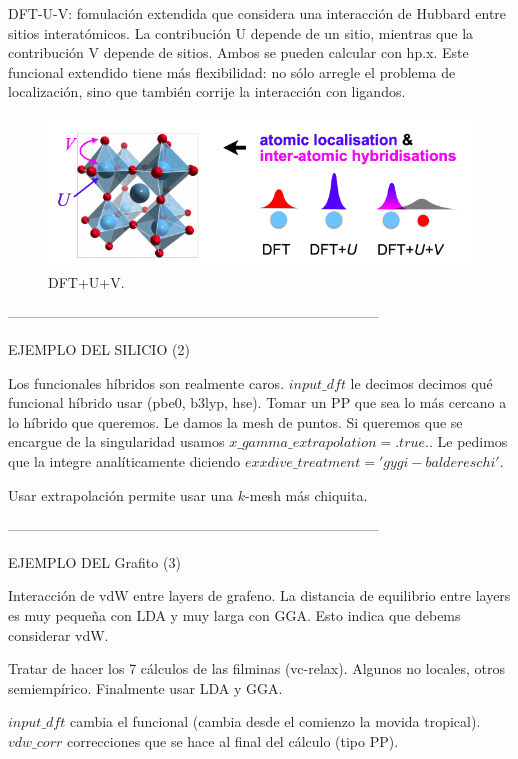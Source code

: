   DFT-U-V: fomulación extendida que considera una interacción de Hubbard entre sitios interatómicos. La contribución U depende de un sitio, mientras que la contribución V depende de sitios. Ambos se pueden calcular con hp.x. Este funcional extendido tiene más flexibilidad: no sólo arregle el problema de localización, sino que también corrije la interacción con ligandos.

  \begin{figure}[H]
      \centering
      \includegraphics[scale = 0.6]{figs/D4/DFT+U+V.png}
      \caption{DFT+U+V.}
      \label{fig:DFT+U+V}
  \end{figure}


  --------------------------------------------------------------------------------

  EJEMPLO DEL SILICIO (2)

  Los funcionales híbridos son realmente caros. $input\_dft$ le decimos decimos qué funcional híbrido usar (pbe0, b3lyp, hse). Tomar un PP que sea lo más cercano a lo híbrido que queremos. Le damos la mesh de puntos. Si queremos que se encargue de la singularidad usamos $x\_gamma\_extrapolation = .true.$. Le pedimos que la integre analíticamente diciendo $exxdive\_treatment = 'gygi-baldereschi'$.

  Usar extrapolación permite usar una $k$-mesh más chiquita.

  --------------------------------------------------------------------------------

  EJEMPLO DEL Grafito (3)

  Interacción de vdW entre layers de grafeno. La distancia de equilibrio entre layers es muy pequeña con LDA y muy larga con GGA. Esto indica que debems considerar vdW.

  Tratar de hacer los 7 cálculos de las filminas (vc-relax). Algunos no locales, otros semiempírico. Finalmente usar LDA y GGA.

  $input\_dft$ cambia el funcional (cambia desde el comienzo la movida tropical).
  $vdw\_corr$ correcciones que se hace al final del cálculo (tipo PP).
